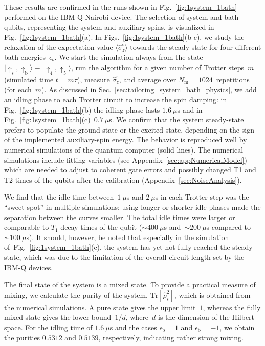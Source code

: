 \documentclass[twocolumn,amsmath,amssymb,pra]{revtex4-2}
\begin{document}
These results are confirmed in the runs shown in Fig.~\ref{fig:1system_1bath} performed on the IBM-Q Nairobi device.
The selection of system and bath qubits, representing the system and auxiliary spins, is visualized in Fig.~\ref{fig:1system_1bath}(a).
In Figs.~\ref{fig:1system_1bath}(b-c),
we study the relaxation of the expectation value $\langle \hat\sigma^\textrm{s}_z\rangle$ towards the steady-state
for four different bath energies~$\epsilon_{b}$.
We start the simulation always from the state
$\lvert \uparrow_\textrm{s},\uparrow_\textrm{b} \rangle \equiv \lvert \uparrow_4,\uparrow_5 \rangle$,
run the algorithm for a given number of Trotter steps~$m$ (simulated time $t=m\tau$),
measure  $\hat\sigma^\textrm{s}_z$, and average over $N_\textrm{m}= 1024$~repetitions (for each~$m$).
As discussed in Sec.~\ref{sec:tailoring_system_bath_physics},
we add an idling phase to each Trotter circuit to increase the spin damping:
in Fig.~\ref{fig:1system_1bath}(b) the idling phase lasts $1.6~\mu$s
and in Fig.~\ref{fig:1system_1bath}(c)~$0.7~\mu$s.
We confirm that the system steady-state prefers to populate the ground state or the excited state,
depending on the sign of the implemented auxiliary-spin energy.
The behavior is reproduced well by numerical simulations of the quantum computer (solid lines).
The numerical simulations include fitting variables (see Appendix~\ref{sec:appNumericalModel}) 
which are needed to adjust to coherent gate errors and possibly changed T1 and T2 times of the qubits after the calibration (Appendix~\ref{sec:NoiseAnalysis}). 

We find that the idle time between~$1~\mu$s and $2~\mu$s in each Trotter step was the ``sweet spot'' in multiple simulations:
using longer or shorter idle phases made the separation between the curves smaller.
The total idle times were larger or comparable to $T_1$ decay times of the qubit
($\sim 400~\mu$s and~$\sim 200~\mu$s compared to~$\sim 100~\mu$s).
It should, however, be noted that
especially in the simulation of~Fig.~\ref{fig:1system_1bath}(c), the system has yet not fully reached the steady-state,
which was due to the limitation of the overall circuit length set by the IBM-Q devices.

The final state of the system is a mixed state. 
To provide a practical measure of mixing, we calculate the purity of the system, $\textrm{Tr}[\hat \rho_\textrm{s}^2]$, 
which is obtained from the numerical simulations. A pure state gives the upper limit~$1$, whereas the fully mixed state gives the 
lower bound~$1/d$, where~$d$ is the dimension of the Hilbert space. 
For the idling time of $1.6~\mu$s and the cases $\epsilon_\textrm{b}=1$ and $\epsilon_\textrm{b}=-1$,
we obtain the purities $0.5312$ and $0.5139$, respectively, 
indicating rather strong mixing. 
\end{document}
